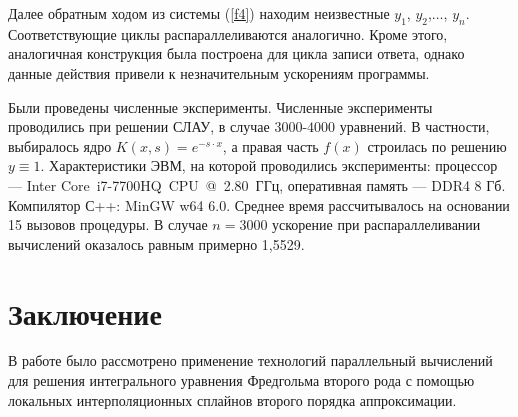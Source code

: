 \documentclass{spisok-article}
\begin{document}
Далее обратным ходом из системы (\ref{f4}) находим неизвестные $y_1$, $y_2$,$\ldots$, $y_n$. Соответствующие циклы распараллеливаются аналогично. Кроме этого, аналогичная конструкция была построена для цикла записи ответа, однако данные действия привели к незначительным ускорениям программы.

Были проведены численные эксперименты. Численные эксперименты проводились при решении СЛАУ, в случае $3000$-$4000$ уравнений. В частности, выбиралось ядро $K\left(x,s\right)=e^{-s \cdot x}$, а правая часть $f\left(x\right)$ строилась по решению $y\equiv 1$. Характе­ристики ЭВМ, на которой проводились эксперименты: процессор --- Inter Core~i7-7700HQ~CPU~@~2.80~ГГц, оперативная память --- DDR4 8 Гб. Компилятор С++: MinGW w64 6.0. Среднее время рассчитывалось
на основании 15 вызовов процедуры. В случае $n=3000$ ускорение при распараллеливании вычислений оказалось равным примерно 1,5529.

\section{Заключение}

В работе было рассмотрено применение технологий параллельный вычислений для решения интегрального уравнения Фредгольма второго рода с помощью локальных интерполяционных сплайнов второго порядка аппроксимации.
\end{document}

